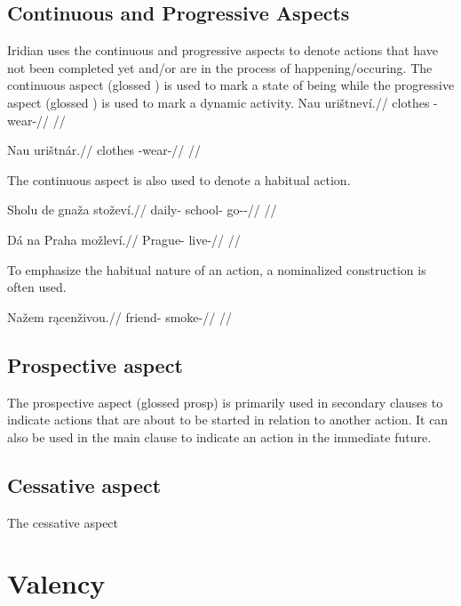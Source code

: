 \subsection{Continuous and Progressive Aspects}
Iridian uses the continuous and progressive aspects to denote actions that have not been completed yet and/or are in the process of happening/occuring. The continuous aspect (glossed ) is used to mark a state of being while the progressive aspect (glossed ) is used to mark a dynamic activity.
\pex
\begingl
\gla Nau urištneví.//
\glb clothes \Refl{}-wear-//
\glft {} //
\endgl
\xe

\pex
\begingl
\gla Nau urištnár.//
\glb clothes \Refl{}-wear-//
\glft {} //
\endgl
\xe

The continuous aspect is also used to denote a habitual action.

\pex
\begingl
\gla Sholu de gnaža stoževí.//
\glb daily-\Ins{}  school-\Pat{} go-\Av{}-\Cont{}//
\glft {} //
\endgl
\xe

\pex
\begingl
\gla Dá na Praha možleví.//
\glb {} \Loc{} Prague-\Pat{} live-//
\glft {} //
\endgl
\xe

To emphasize the habitual nature of an action, a nominalized construction is often used.

\pex
\begingl
\gla Nažem r\k{a}cenživou.//
\glb friend-\First{}\Sg{} smoke-//
\glft {} //
\endgl
\xe

\subsection{Prospective aspect}
\par The prospective aspect (glossed {\sc prosp}) is primarily used in secondary clauses to indicate actions that are about to be started in relation to another action. It can also be used in the main clause to indicate an action in the immediate future.

\subsection{Cessative aspect}
The cessative aspect

\section{Valency}


